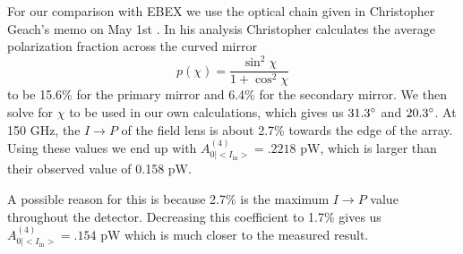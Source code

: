 \documentclass{article}
\theoremstyle{remark}
\newcommand{\tab}{\hspace*{2em}}
\renewcommand{\t}[1]{\text{#1}}
\newcommand{\AI}{A^{(4)}_{0|<I_{\t{in}}>}}
\newcommand{\ip}{$I\rightarrow P$ }
\begin{document}
\tab For our comparison with EBEX we use the optical chain given in Christopher Geach's memo on May 1st \cite{geach_2017}.
In his analysis Christopher calculates the average polarization fraction across the curved mirror
\[p(\chi) = \frac{\sin^2 \chi}{1 + \cos^2 \chi}\]
to be 15.6\% for the primary mirror and 6.4\% for the secondary mirror. 
We then solve for $\chi$ to be used in our own calculations, which gives us $31.3\degree$ and $20.3 \degree$.
At 150 GHz, the \ip of the field lens is about 2.7\% towards the edge of the array.
Using these values we end up with $\AI = .2218 \t{ pW}$, which is larger than their observed value of 0.158 pW.

\tab A possible reason for this is because 2.7\% is the maximum \ip value throughout the detector. 
Decreasing this coefficient to 1.7\% gives us $\AI = .154 \t{ pW}$ which is much closer to the measured result.





 
\end{document}
